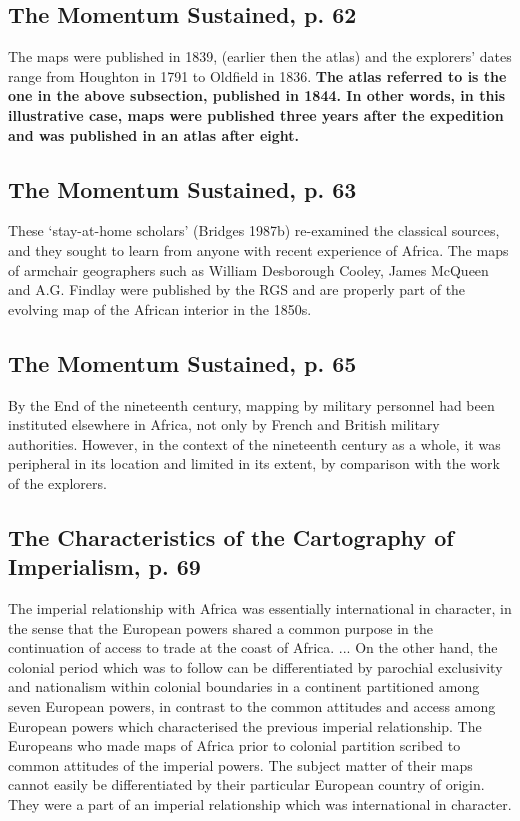 \documentclass[12pt]{article}
\begin{document}
\subsection{The Momentum Sustained, p. 62}

The maps were published in 1839, (earlier then the atlas) and the explorers'
dates range from Houghton in 1791 to Oldfield in 1836. \textbf{The atlas
referred to is the one in the above subsection, published in 1844. In other
words, in this illustrative case, maps were published three years after the
expedition and was published in an atlas after eight.}

\subsection{The Momentum Sustained, p. 63}
These `stay-at-home scholars' (Bridges 1987b) re-examined the classical sources,
and they sought to learn from anyone with recent experience of Africa. The maps
of armchair geographers such as William Desborough Cooley, James McQueen and
A.G. Findlay were published by the RGS and are properly part of the evolving map
of the African interior in the 1850s.

\subsection{The Momentum Sustained, p. 65}
By the End of the nineteenth century, mapping by military personnel had been
instituted elsewhere in Africa, not only by French and British military
authorities. However, in the context of the nineteenth century as a whole, it
was peripheral in its location and limited in its extent, by comparison with the
work of the explorers. 

\subsection{The Characteristics of the Cartography of Imperialism, p. 69}

The imperial relationship with Africa was essentially international in
character, in the sense that the European powers shared a common purpose in the
continuation of access to trade at the coast of Africa. ... On the other hand,
the colonial period which was to follow can be differentiated by parochial
exclusivity and nationalism within colonial boundaries in a continent
partitioned among seven European powers, in contrast to the common attitudes and
access among European powers which characterised the previous imperial
relationship. The Europeans who made maps of Africa prior to colonial partition
scribed to common attitudes of the imperial powers. The subject matter of
their maps cannot easily be differentiated by their particular European country
of origin. They were a part of an imperial relationship which was international
in character.
\end{document}
